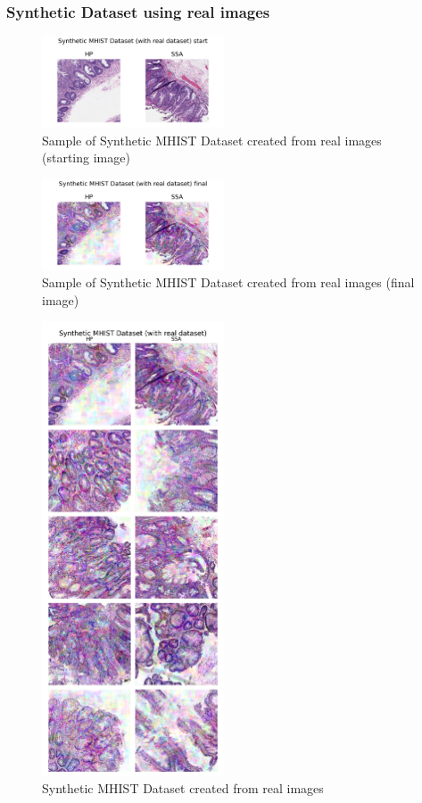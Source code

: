 \documentclass[conference, compsoc]{IEEEtran}
\begin{document}
\subsubsection{Synthetic Dataset using real images}
\begin{figure}[H]
	\centering
	\includegraphics[width=0.48\textwidth]{mhist_real_sample.png}
	\caption{Sample of Synthetic MHIST Dataset created from real images (starting image)}
	\label{fig:mhist_real_sample}
\end{figure}
\begin{figure}[H]
	\centering
	\includegraphics[width=0.48\textwidth]{mhist_real_syn.png}
	\caption{Sample of Synthetic MHIST Dataset created from real images (final image)}
	\label{fig:mhist_real_final}
\end{figure}


\begin{figure}[H]
	\centering
	\includegraphics[width=0.48\textwidth]{mhist_real_syn_all.png}
	\caption{Synthetic MHIST Dataset created from real images}
	\label{fig:mhist_real_syn_all}
\end{figure}
\end{document}
